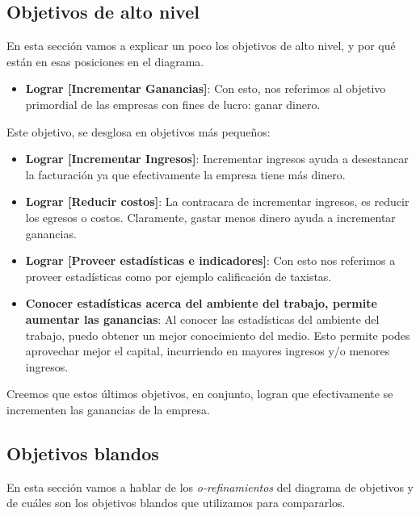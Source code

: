 \documentclass[a4paper, 10pt, twoside]{article}
\begin{document}
\subsection{Objetivos de alto nivel}

En esta sección vamos a explicar un poco los objetivos de alto nivel, y por qué están en esas posiciones en el diagrama.

\begin{itemize}

\item \textbf{Lograr [Incrementar Ganancias]}: Con esto, nos referimos al objetivo primordial de las empresas con fines de lucro: ganar dinero.
\end{itemize}
Este objetivo, se desglosa en objetivos más pequeños:
\begin{itemize}

\item \textbf{Lograr [Incrementar Ingresos]}: Incrementar ingresos ayuda a desestancar la facturación ya que efectivamente la empresa tiene más dinero.

\item \textbf{Lograr [Reducir costos]}: La contracara de incrementar ingresos, es reducir los egresos o costos. Claramente, gastar menos dinero ayuda a incrementar ganancias.

\item \textbf{Lograr [Proveer estadísticas e indicadores]}: Con esto nos referimos a proveer estadísticas como por ejemplo calificación de taxistas.

\item \textbf{Conocer estadísticas acerca del ambiente del trabajo, permite aumentar las ganancias}: Al conocer las estadísticas del ambiente del trabajo, puedo obtener un mejor conocimiento del medio. Esto permite podes aprovechar mejor el capital, incurriendo en mayores ingresos y/o menores ingresos.

\end{itemize}

Creemos que estos últimos objetivos, en conjunto, logran que efectivamente se incrementen las ganancias de la empresa.

\subsection{Objetivos blandos}

En esta sección vamos a hablar de los \emph{o-refinamientos} del diagrama de objetivos y de cuáles son los objetivos blandos que utilizamos para compararlos.
\end{document}
